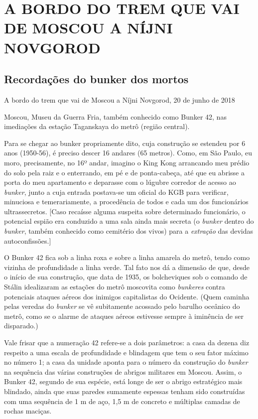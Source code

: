 \part{A BORDO DO TREM QUE VAI DE MOSCOU A NÍJNI NOVGOROD}

\chapter*{Recordações do bunker dos mortos}

\begin{flushright}
A bordo do trem que vai de Moscou a Níjni Novgorod, 20 de junho de 2018
\end{flushright}


Moscou, Museu da Guerra Fria, também conhecido como Bunker 42, nas
imediações da estação Taganskaya do metrô (região central).

Para se chegar ao bunker propriamente dito, cuja construção se estendeu
por 6 anos (1950-56), é preciso descer 16 andares (65 metros). Como, em
São Paulo, eu moro, precisamente, no 16º andar, imagino o King Kong
arrancando meu prédio do solo pela raiz e o enterrando, em pé e de
ponta-cabeça, até que eu abrisse a porta do meu apartamento e deparasse
com o lúgubre corredor de acesso ao \emph{bunker}, junto a cuja entrada
postava-se um oficial do KGB para verificar, minuciosa e temerariamente,
a procedência de todos e cada um dos funcionários ultrassecretos.
{[}Caso recaísse alguma suspeita sobre determinado funcionário, o
potencial espião era conduzido a uma sala ainda mais secreta (o
\emph{bunker} dentro do \emph{bunker}, também conhecido como cemitério
dos vivos) para a \emph{extração} das devidas autoconfissões.{]}

O Bunker 42 fica sob a linha roxa e sobre a linha amarela do metrô,
tendo como vizinha de profundidade a linha verde. Tal fato nos dá a
dimensão de que, desde o início de sua construção, que data de 1935, os
bolcheviques sob o comando de Stálin idealizaram as estações do metrô
moscovita como \emph{bunkeres} contra potenciais ataques aéreos dos
inimigos capitalistas do Ocidente. (Quem caminha pelas veredas do
\emph{bunker} se vê subitamente acossado pelo barulho oceânico do metrô,
como se o alarme de ataques aéreos estivesse sempre à iminência de ser
disparado.)

Vale frisar que a numeração 42 refere-se a dois parâmetros: a casa da
dezena diz respeito a uma escala de profundidade e blindagem que tem o
seu fator máximo no número 1; a casa da unidade aponta para o número da
construção do \emph{bunker} na sequência das várias construções de
abrigos militares em Moscou. Assim, o Bunker 42, segundo de sua espécie,
está longe de ser o abrigo estratégico mais blindado, ainda que suas
paredes sumamente espessas tenham sido construídas com uma sequência de
1 m de aço, 1,5 m de concreto e múltiplas camadas de rochas maciças.

